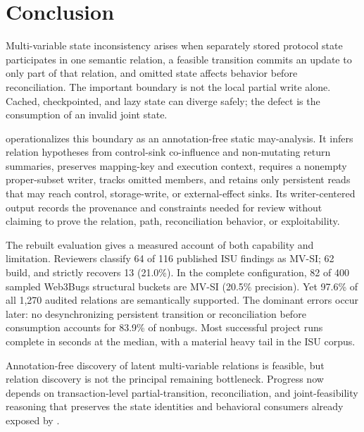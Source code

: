 
\section{Conclusion}
\label{s:conclusion}

Multi-variable state inconsistency arises when separately stored protocol state participates in one semantic relation, a feasible transition commits an update to only part of that relation, and omitted state affects behavior before reconciliation. The important boundary is not the local partial write alone. Cached, checkpointed, and lazy state can diverge safely; the defect is the consumption of an invalid joint state.

\sys operationalizes this boundary as an annotation-free static may-analysis. It infers relation hypotheses from control-sink co-influence and non-mutating return summaries, preserves mapping-key and execution context, requires a nonempty proper-subset writer, tracks omitted members, and retains only persistent reads that may reach control, storage-write, or external-effect sinks. Its writer-centered output records the provenance and constraints needed for review without claiming to prove the relation, path, reconciliation behavior, or exploitability.

The rebuilt evaluation gives a measured account of both capability and limitation. Reviewers classify 64 of 116 published ISU findings as MV-SI; 62 build, and \sys strictly recovers 13 (21.0\%). In the complete configuration, 82 of 400 sampled Web3Bugs structural buckets are MV-SI (20.5\% precision). Yet 97.6\% of all 1,270 audited relations are semantically supported. The dominant errors occur later: no desynchronizing persistent transition or reconciliation before consumption accounts for 83.9\% of nonbugs. Most successful project runs complete in seconds at the median, with a material heavy tail in the ISU corpus.

Annotation-free discovery of latent multi-variable relations is feasible, but relation discovery is not the principal remaining bottleneck. Progress now depends on transaction-level partial-transition, reconciliation, and joint-feasibility reasoning that preserves the state identities and behavioral consumers already exposed by \sys.